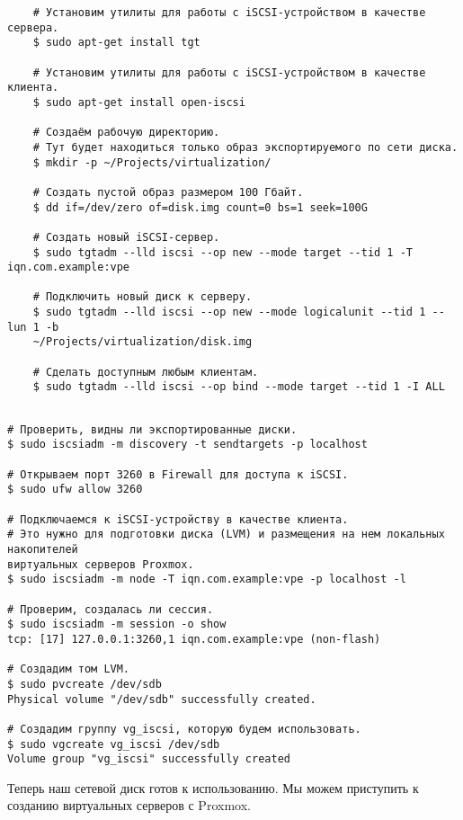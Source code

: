 \documentclass[14pt, a4paper]{article}
\begin{document}
\begin{lstlisting}
    # Установим утилиты для работы с iSCSI-устройством в качестве сервера.
    $ sudo apt-get install tgt
    
    # Установим утилиты для работы с iSCSI-устройством в качестве клиента.
    $ sudo apt-get install open-iscsi
    
    # Создаём рабочую директорию.
    # Тут будет находиться только образ экспортируемого по сети диска.
    $ mkdir -p ~/Projects/virtualization/
    
    # Создать пустой образ размером 100 Гбайт.
    $ dd if=/dev/zero of=disk.img count=0 bs=1 seek=100G
    
    # Создать новый iSCSI-сервер.
    $ sudo tgtadm --lld iscsi --op new --mode target --tid 1 -T iqn.com.example:vpe
    
    # Подключить новый диск к серверу.
    $ sudo tgtadm --lld iscsi --op new --mode logicalunit --tid 1 --lun 1 -b
    ~/Projects/virtualization/disk.img
    
    # Сделать доступным любым клиентам.
    $ sudo tgtadm --lld iscsi --op bind --mode target --tid 1 -I ALL

\end{lstlisting}


\newpage
\begin{lstlisting}

# Проверить, видны ли экспортированные диски.
$ sudo iscsiadm -m discovery -t sendtargets -p localhost

# Открываем порт 3260 в Firewall для доступа к iSCSI.
$ sudo ufw allow 3260

# Подключаемся к iSCSI-устройству в качестве клиента.
# Это нужно для подготовки диска (LVM) и размещения на нем локальных накопителей
виртуальных серверов Proxmox.
$ sudo iscsiadm -m node -T iqn.com.example:vpe -p localhost -l

# Проверим, создалась ли сессия.
$ sudo iscsiadm -m session -o show
tcp: [17] 127.0.0.1:3260,1 iqn.com.example:vpe (non-flash)

# Создадим том LVM.
$ sudo pvcreate /dev/sdb
Physical volume "/dev/sdb" successfully created.

# Создадим группу vg_iscsi, которую будем использовать.
$ sudo vgcreate vg_iscsi /dev/sdb
Volume group "vg_iscsi" successfully created
\end{lstlisting}

Теперь наш сетевой диск готов к использованию. Мы можем приступить к созданию виртуальных
серверов с Proxmox.
\end{document}

